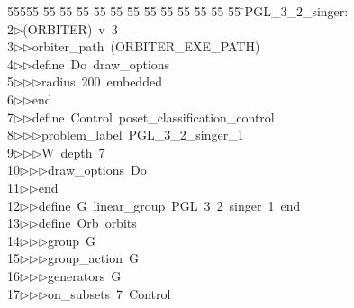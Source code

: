 %
%
\begin{tabbing}
55555 \= 55 \= 55 \= 55 \= 55 \= 55 \= 55 \= 55 \= 55 \= 55 \= 55 \= 55 \= 55 \= \>PGL\_3\_2\_singer:\\[0pt]
2\>$\triangleright$\>(ORBITER)\ v\ 3\ \\[0pt]
3\>$\triangleright$\>$\triangleright$\>orbiter\_path\ (ORBITER\_EXE\_PATH)\ \\[0pt]
4\>$\triangleright$\>$\triangleright$\>define\ Do\ draw\_options\ \\[0pt]
5\>$\triangleright$\>$\triangleright$\>$\triangleright$\>radius\ 200\ embedded\ \\[0pt]
6\>$\triangleright$\>$\triangleright$\>end\ \\[0pt]
7\>$\triangleright$\>$\triangleright$\>define\ Control\ poset\_classification\_control\ \\[0pt]
8\>$\triangleright$\>$\triangleright$\>$\triangleright$\>problem\_label\ PGL\_3\_2\_singer\_1\ \\[0pt]
9\>$\triangleright$\>$\triangleright$\>$\triangleright$\>W\ depth\ 7\ \\[0pt]
10\>$\triangleright$\>$\triangleright$\>$\triangleright$\>draw\_options\ Do\ \\[0pt]
11\>$\triangleright$\>$\triangleright$\>end\ \\[0pt]
12\>$\triangleright$\>$\triangleright$\>define\ G\ linear\_group\ PGL\ 3\ 2\ singer\ 1\ end\ \\[0pt]
13\>$\triangleright$\>$\triangleright$\>define\ Orb\ orbits\ \\[0pt]
14\>$\triangleright$\>$\triangleright$\>$\triangleright$\>group\ G\ \\[0pt]
15\>$\triangleright$\>$\triangleright$\>$\triangleright$\>group\_action\ G\ \\[0pt]
16\>$\triangleright$\>$\triangleright$\>$\triangleright$\>generators\ G\ \\[0pt]
17\>$\triangleright$\>$\triangleright$\>$\triangleright$\>on\_subsets\ 7\ Control\ \\[0pt]

\end{tabbing}
